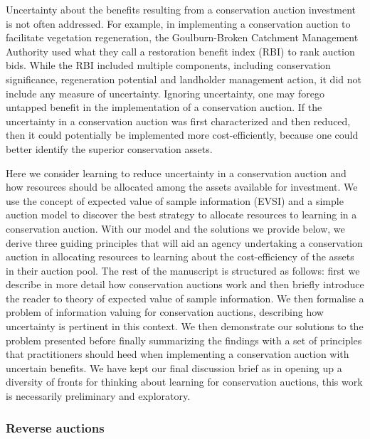 \documentclass[]{article}
\theoremstyle{definition}
\theoremstyle{definition}
\theoremstyle{remark}
\begin{document}
Uncertainty about the benefits resulting from a conservation auction
investment is not often addressed. For example, in implementing a
conservation auction to facilitate vegetation regeneration, the
Goulburn-Broken Catchment Management Authority \citep{Miles2008} used
what they call a restoration benefit index (RBI) to rank auction bids.
While the RBI included multiple components, including conservation
significance, regeneration potential and landholder management action,
it did not include any measure of uncertainty. Ignoring uncertainty, one
may forego untapped benefit in the implementation of a conservation
auction. If the uncertainty in a conservation auction was first
characterized and then reduced, then it could potentially be implemented
more cost-efficiently, because one could better identify the superior
conservation assets.

Here we consider learning to reduce uncertainty in a conservation
auction and how resources should be allocated among the assets available
for investment. We use the concept of expected value of sample
information (EVSI) \citep{Raiffa1961} and a simple auction model to
discover the best strategy to allocate resources to learning in a
conservation auction. With our model and the solutions we provide below,
we derive three guiding principles that will aid an agency undertaking a
conservation auction in allocating resources to learning about the
cost-efficiency of the assets in their auction pool. The rest of the
manuscript is structured as follows: first we describe in more detail
how conservation auctions work and then briefly introduce the reader to
theory of expected value of sample information. We then formalise a
problem of information valuing for conservation auctions, describing how
uncertainty is pertinent in this context. We then demonstrate our
solutions to the problem presented before finally summarizing the
findings with a set of principles that practitioners should heed when
implementing a conservation auction with uncertain benefits. We have
kept our final discussion brief as in opening up a diversity of fronts
for thinking about learning for conservation auctions, this work is
necessarily preliminary and exploratory.

\subsubsection*{Reverse auctions}\label{reverse-auctions}
\end{document}
